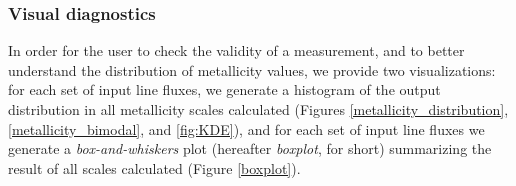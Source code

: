 \documentclass{emulateapj}
\begin{document}



\subsubsection{Visual diagnostics}\label{vizs}
In order for the user to check the validity of a measurement, and to better understand the distribution of metallicity values, we provide two visualizations: for each set of input line fluxes, we generate a histogram of the output distribution in all metallicity scales calculated (Figures \ref{metallicity_distribution}, \ref{metallicity_bimodal}, and \ref{fig:KDE}), and for each set of input line fluxes we generate a \emph{box-and-whiskers} plot (hereafter \emph{boxplot}, for short) summarizing the result of all scales calculated (Figure \ref{boxplot}). 
\end{document}
